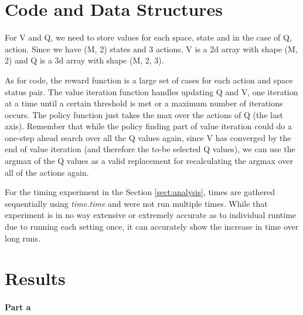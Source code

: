\documentclass[12pt]{article}
\begin{document}
\section{Code and Data Structures}

For V and Q, we need to store values for each space, state and in the case of Q, action. Since we have (M, 2) states and 3 actions, V is a 2d array with shape (M, 2) and Q is a 3d array with shape (M, 2, 3).

As for code, the reward function is a large set of cases for each action and space status pair. The value iteration function handles updating Q and V, one iteration at a time until a certain threshold is met or a maximum number of iterations occurs. The policy function just takes the max over the actions of Q (the last axis). Remember that while the policy finding part of value iteration could do a one-step ahead search over all the Q values again, since V has converged by the end of value iteration (and therefore the to-be selected Q values), we can use the argmax of the Q values as a valid replacement for recalculating the argmax over all of the actions again.

For the timing experiment in the Section \ref{sect:analysis}, times are gathered sequentially using \textit{time.time} and were not run multiple times. While that experiment is in no way extensive or extremely accurate as to individual runtime due to running each setting once, it can accurately show the increase in time over long runs.

\section{Results}

\paragraph{Part a}
\end{document}
